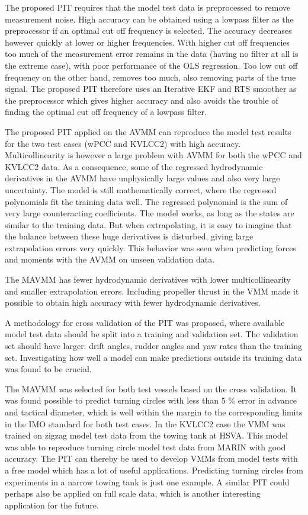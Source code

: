 \documentclass[review]{elsarticle}
\begin{document}
\sphinxAtStartPar
The proposed PIT requires that the model test data is preprocessed to remove measurement noise. High accuracy can be obtained using a low\sphinxhyphen{}pass filter as the preprocessor if an optimal cut off frequency is selected. The accuracy decreases however quickly at lower or higher frequencies. With higher cut off frequencies too much of the measurement error remains in the data (having no filter at all is the extreme case), with poor performance of the OLS regression. Too low cut off frequency on the other hand, removes too much, also removing parts of the true signal. The proposed PIT therefore uses an Iterative EKF and RTS smoother as the preprocessor which gives higher accuracy and also avoids the trouble of finding the optimal cut off frequency of a low\sphinxhyphen{}pass filter.

\sphinxAtStartPar
The proposed PIT applied on the AVMM can reproduce the model test results for the two test cases (wPCC and KVLCC2) with high accuracy. Multicollinearity is however a large problem with AVMM for both the wPCC and KVLCC2 data. As a consequence, some of the regressed hydrodynamic derivatives in the AVMM have unphysically large values and also very large uncertainty. The model is still mathematically correct, where the regressed polynomials fit the training data well.
The regressed polynomial is the sum of very large counteracting coefficients. The model works, as long as the states are similar to the training data. But when extrapolating, it is easy to imagine that the balance between these huge derivatives is disturbed, giving large extrapolation errors very quickly. This behavior was seen when predicting forces and moments with the AVMM on unseen validation data.

\sphinxAtStartPar
The MAVMM has fewer hydrodynamic derivatives with lower multicollinearity and smaller extrapolation errors. Including propeller thrust in the VMM made it possible to obtain high accuracy with fewer hydrodynamic derivatives.

\sphinxAtStartPar
A methodology for cross validation of the PIT was proposed, where available model test data should be split into a training and validation set. The validation set should have larger: drift angles, rudder angles and yaw rates than the training set. Investigating how well a model can make predictions outside its training data was found to be crucial.

\sphinxAtStartPar
The MAVMM was selected for both test vessels based on the cross validation. It was found possible to predict turning circles with less than 5 \% error in advance and tactical diameter, which is well within the margin to the corresponding limits in the IMO standard for both test cases. In the KVLCC2 case the VMM was trained on zigzag model test data from the towing tank at HSVA. This model was able to reproduce turning circle model test data from MARIN with good accuracy. The PIT can thereby be used to develop VMMs from model tests with a free model which has a lot of useful applications. Predicting turning circles from experiments in a narrow towing tank is just one example. A similar PIT could perhaps also be applied on full scale data, which is another interesting application for the future.
\end{document}
